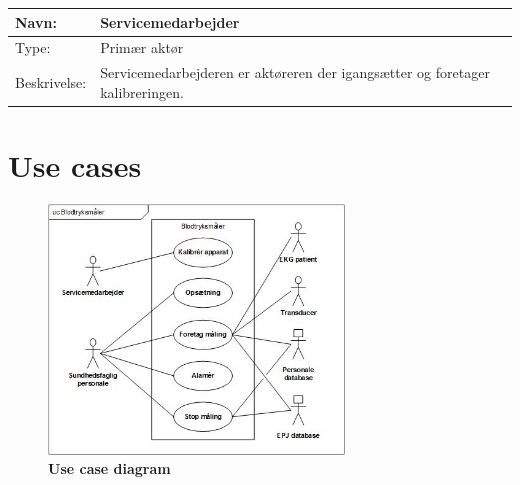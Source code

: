 \begin{table}[h!]
\begin{tabular}{| >{\raggedright\arraybackslash}p{3cm} | >{\raggedright\arraybackslash}p{12cm} |}
   \hline
   Navn: & Servicemedarbejder\\ \hline
   Type: & Primær aktør \\ \hline
   Beskrivelse: & Servicemedarbejderen er aktøreren der igangsætter og foretager kalibreringen.\\ \hline
\end{tabular}
\end{table}

\newpage

\section{Use cases}
\begin{figure}[H]
\includegraphics[width =0.7\textwidth , center]{billeder/UseCaseDiagram}
\caption{\textbf{Use case diagram}}
\end{figure}


